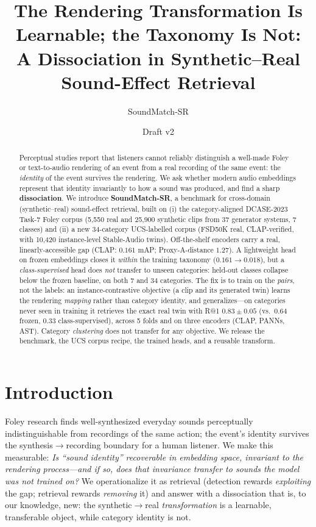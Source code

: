\documentclass[11pt]{article}
\title{The Rendering Transformation Is Learnable; the Taxonomy Is Not:\\
A Dissociation in Synthetic--Real Sound-Effect Retrieval}
\author{SoundMatch-SR}
\date{Draft v2}
\begin{document}
\maketitle

\begin{abstract}
Perceptual studies report that listeners cannot reliably distinguish a well-made Foley or
text-to-audio rendering of an event from a real recording of the same event: the \emph{identity}
of the event survives the rendering. We ask whether modern audio embeddings represent that
identity invariantly to how a sound was produced, and find a sharp \textbf{dissociation}. We
introduce \textbf{SoundMatch-SR}, a benchmark for cross-domain (synthetic--real) sound-effect
retrieval, built on (i) the category-aligned DCASE-2023 Task-7 Foley corpus (5{,}550 real and
25{,}900 synthetic clips from 37 generator systems, 7 classes) and (ii) a new 34-category
UCS-labelled corpus (FSD50K real, CLAP-verified, with 10{,}420 instance-level Stable-Audio twins).
Off-the-shelf encoders carry a real, linearly-accessible gap (CLAP: $0.161$ mAP;
Proxy-A-distance $1.27$). A lightweight head on frozen embeddings closes it \emph{within} the
training taxonomy ($0.161\!\to\!0.018$), but a \emph{class-supervised} head does \emph{not}
transfer to unseen categories: held-out classes collapse below the frozen baseline, on both 7 and
34 categories. The fix is to train on the \emph{pairs}, not the labels: an instance-contrastive
objective (a clip and its generated twin) learns the rendering \emph{mapping} rather than category
identity, and generalizes---on categories never seen in training it retrieves the exact real twin
with R@1 $0.83\pm0.05$ (vs.\ $0.64$ frozen, $0.33$ class-supervised), across 5 folds and on three
encoders (CLAP, PANNs, AST). Category \emph{clustering} does not transfer for any objective. We
release the benchmark, the UCS corpus recipe, the trained heads, and a reusable transform.
\end{abstract}

\section{Introduction}
Foley research finds well-synthesized everyday sounds perceptually indistinguishable from
recordings of the same action; the event's identity survives the synthesis$\to$recording boundary
for a human listener. We make this measurable:
\emph{Is ``sound identity'' recoverable in embedding space, invariant to the rendering process---and
if so, does that invariance transfer to sounds the model was not trained on?}
We operationalize it as retrieval (detection rewards \emph{exploiting} the gap; retrieval rewards
\emph{removing} it) and answer with a dissociation that is, to our knowledge, new: the
synthetic$\to$real \emph{transformation} is a learnable, transferable object, while category
identity is not.
\end{document}
